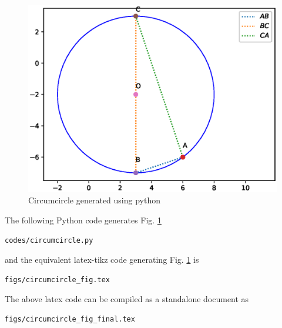\begin{enumerate}[label=\thesection.\arabic*.,ref=\thesection.\theenumi]
\begin{figure}[!ht]
\centering
\includegraphics[width=\columnwidth]{./figs/circumcircle.eps}
\caption{Circumcircle generated using python}
\label{fig:Circumcircle2}
\end{figure} 

\solution The  following Python code generates Fig. \ref{fig:Circumcircle2}

\begin{lstlisting}
codes/circumcircle.py
\end{lstlisting}

and the equivalent latex-tikz code generating Fig. \ref{fig:Circumcircle2} is 
\begin{lstlisting}
figs/circumcircle_fig.tex
\end{lstlisting}
%
The above latex code can be compiled as a standalone document as
\begin{lstlisting}
figs/circumcircle_fig_final.tex
\end{lstlisting}
\end{enumerate}

